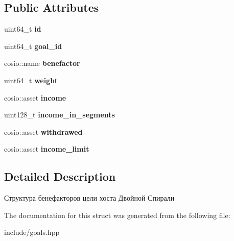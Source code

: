\subsection*{Public Attributes}
\begin{DoxyCompactItemize}
\item 
\mbox{\label{structbenefactors_a677d15f6844aa2618566bca02c20808f}} 
uint64\+\_\+t {\bfseries id}
\item 
\mbox{\label{structbenefactors_a7b9d60f025b5db37474b888ad430cee6}} 
uint64\+\_\+t {\bfseries goal\+\_\+id}
\item 
\mbox{\label{structbenefactors_ae2840b5c590b2da9ed8d0c8e91ad2269}} 
eosio\+::name {\bfseries benefactor}
\item 
\mbox{\label{structbenefactors_a0c58861df063615af17d5aca5ac4761c}} 
uint64\+\_\+t {\bfseries weight}
\item 
\mbox{\label{structbenefactors_aae6f5d97fb66739c2b6a41914be408ec}} 
eosio\+::asset {\bfseries income}
\item 
\mbox{\label{structbenefactors_a850b07383b638938edde052640f30512}} 
uint128\+\_\+t {\bfseries income\+\_\+in\+\_\+segments}
\item 
\mbox{\label{structbenefactors_a725375e8dab014236bbbcd9e9366b80d}} 
eosio\+::asset {\bfseries withdrawed}
\item 
\mbox{\label{structbenefactors_a355c9adaf5e7f448493a256a1f8b4edd}} 
eosio\+::asset {\bfseries income\+\_\+limit}
\end{DoxyCompactItemize}


\subsection{Detailed Description}
Структура бенефакторов цели хоста Двойной Спирали 

The documentation for this struct was generated from the following file\+:\begin{DoxyCompactItemize}
\item 
include/goals.\+hpp\end{DoxyCompactItemize}

